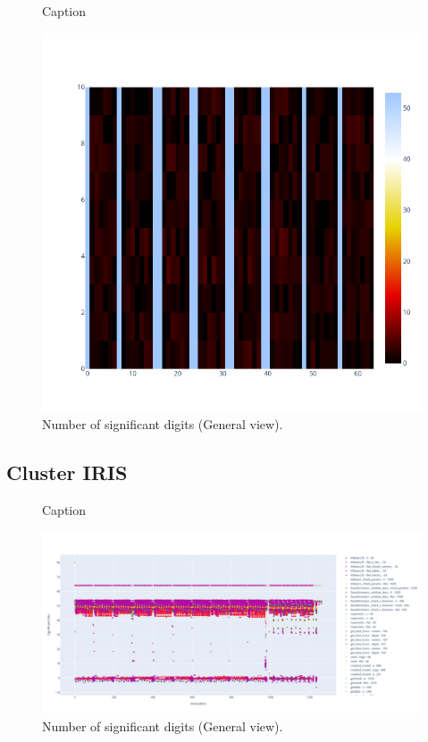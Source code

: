 \documentclass[11pt]{article}
\begin{document}
\begin{figure}
    \centering
    \caption{Caption}
    \includegraphics[width=\linewidth]{figure/classifier_comparisons/zoom_SAG_fit_coef_s.png}
    \caption{Number of significant digits (General view).}
    \label{fig:classifier_comparisons_general}
\end{figure}


\subsection{Cluster IRIS}


\begin{figure}
    \centering
    \caption{Caption}
    \includegraphics[width=\linewidth]{figure/cluster_iris/general.png}
    \caption{Number of significant digits (General view).}
    \label{fig:cluster_iris_general}
\end{figure}
\end{document}
